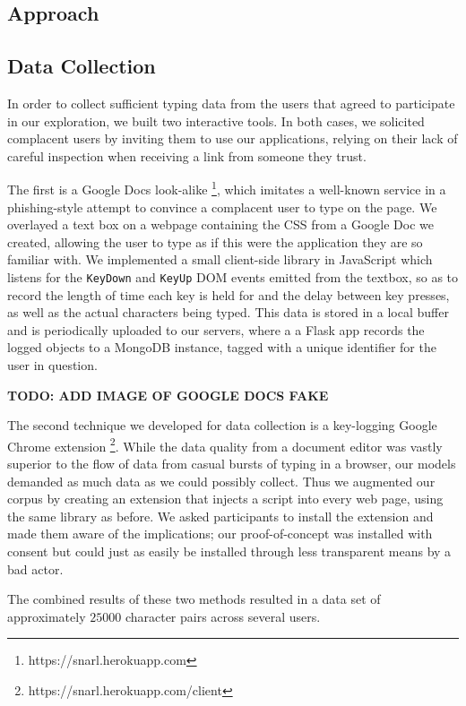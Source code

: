 \documentclass{amsart}
\begin{document}
\begin{multicols*}{2}
\section{Approach}
\subsection{Data Collection}

In order to collect sufficient typing data from the users that agreed to participate in our exploration, we built two interactive tools. In both cases, we solicited complacent users by inviting them to use our applications, relying on their lack of careful inspection when receiving a link from someone they trust.

The first is a Google Docs look-alike \footnote{https://snarl.herokuapp.com}, which imitates a well-known service in a phishing-style attempt to convince a complacent user to type on the page. We overlayed a text box on a webpage containing the CSS from a Google Doc we created, allowing the user to type as if this were the application they are so familiar with. We implemented a small client-side library in JavaScript which listens for the \texttt{KeyDown} and \texttt{KeyUp} DOM events emitted from the textbox, so as to record the length of time each key is held for and the delay between key presses, as well as the actual characters being typed. This data is stored in a local buffer and is periodically uploaded to our servers, where a a Flask app records the logged objects to a MongoDB instance, tagged with a unique identifier for the user in question.

\textbf{TODO: ADD IMAGE OF GOOGLE DOCS FAKE}

The second technique we developed for data collection is a key-logging Google Chrome extension \footnote{https://snarl.herokuapp.com/client}. While the data quality from a document editor was vastly superior to the flow of data from casual bursts of typing in a browser, our models demanded as much data as we could possibly collect. Thus we augmented our corpus by creating an extension that injects a script into every web page, using the same library as before. We asked participants to install the extension and made them aware of the implications; our proof-of-concept was installed with consent but could just as easily be installed through less transparent means by a bad actor.

The combined results of these two methods resulted in a data set of approximately $25000$ character pairs across several users.


\end{multicols*}
\end{document}

